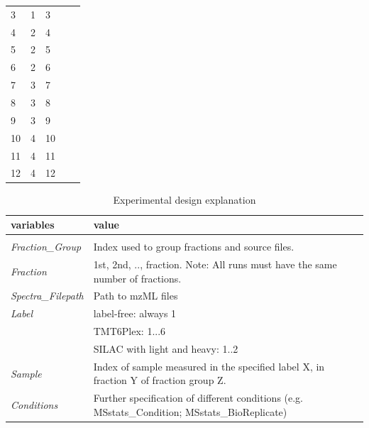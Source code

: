 \begin{table}[!ht]
\begin{tabular}{lllll}
3               & 1                  & 3                     &       &        \\
4               & 2                  & 4                     &       &        \\
5               & 2                  & 5                     &       &        \\
6               & 2                  & 6                     &       &        \\
7               & 3                  & 7                     &       &        \\
8               & 3                  & 8                     &       &        \\
9               & 3                  & 9                     &       &        \\
10              & 4                  & 10                    &       &        \\
11              & 4                  & 11                    &       &        \\
12              & 4                  & 12                    &       &       
\end{tabular}
\end{table}

\begin{table}[!ht]
\centering
\small
\caption{Experimental design explanation}
\label{t:Experimental_design_exp}
\begin{tabularx}{\textwidth}{l|X}
\textbf{variables} & \textbf{value} \\ 
\hline \\
\textit{Fraction\_Group} &  Index used to group fractions and source files.  \\
\textit{Fraction} & 1st, 2nd, .., fraction. Note: All runs must have the same number of fractions. \\
\textit{Spectra\_Filepath} & Path to mzML files \\
\textit{Label} & label-free: always 1 \\
\textit{} & TMT6Plex: 1...6 \\
\textit{} & SILAC with light and heavy: 1..2 \\
\textit{Sample} & Index of sample measured in the specified label X, in fraction Y of fraction group Z. \\
\textit{Conditions} & Further specification of different conditions (e.g. MSstats\_Condition; MSstats\_BioReplicate) \\
\end{tabularx}
\end{table}


